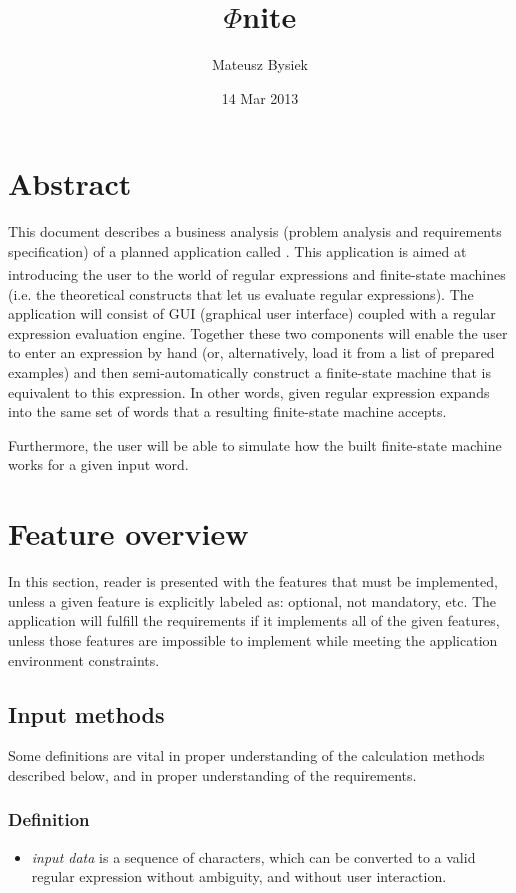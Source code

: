\documentclass{article}
\title{$\Phi$nite}
\author{Mateusz Bysiek}
\date{14 Mar 2013}
\begin{document}


\section*{Abstract}

This document describes a business analysis (problem analysis and requirements specification) of a
planned application called \titletext. This application is aimed at introducing the user to the
world of regular expressions\textsuperscript{\cite{wiki_rl}} and finite-state
machines\textsuperscript{\cite{wiki_fsm}} (i.e. the theoretical constructs that let us evaluate
regular expressions). The application will consist of GUI (graphical user interface) coupled with a
regular expression evaluation engine. Together these two components will enable the user to enter an
expression by hand (or, alternatively, load it from a list of prepared examples) and then
semi-automatically construct a finite-state machine that is equivalent to this expression.
In other words, given regular expression expands into the same set of words that a resulting
finite-state machine accepts.

Furthermore, the user will be able to simulate how the built finite-state machine works for a given
input word.

\section{Feature overview}
In this section, reader is presented with the features that must be implemented, unless a given
feature is explicitly labeled as: optional, not mandatory, etc. The application will fulfill the
requirements if it implements all of the given features, unless those features are impossible to
implement while meeting the application environment constraints.

\subsection{Input methods}
Some definitions are vital in proper understanding of the calculation methods described below, and
in proper understanding of the requirements.

\subsubsection*{Definition}
\begin{itemize}

  \item \textit{input data} is a sequence of characters, which can be converted to a valid regular
  expression without ambiguity, and without user interaction.

\end{itemize}
\end{document}
